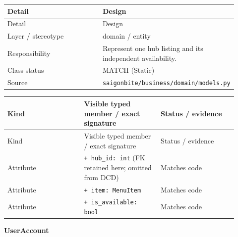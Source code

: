 \begin{longtable}{>{\raggedright\arraybackslash}p{0.4600\linewidth}>{\raggedright\arraybackslash}p{0.4600\linewidth}}
Detail & Design \\
\hline\endfirsthead
Detail & Design \\
\hline\endhead
Layer / stereotype & domain / \guillemotleft{}entity\guillemotright{} \\
Responsibility & Represent one hub listing and its independent availability. \\
Class status & MATCH (Static) \\
Source & \texttt{saigonbite/\allowbreak{}business/\allowbreak{}domain/\allowbreak{}models.\allowbreak{}py} \\
\end{longtable}
\begin{longtable}{>{\raggedright\arraybackslash}p{0.3067\linewidth}>{\raggedright\arraybackslash}p{0.3067\linewidth}>{\raggedright\arraybackslash}p{0.3067\linewidth}}
Kind & Visible typed member / exact signature & Status / evidence \\
\hline\endfirsthead
Kind & Visible typed member / exact signature & Status / evidence \\
\hline\endhead
Attribute & \texttt{+ hub\_\allowbreak{}id: int} (FK retained here; omitted from DCD) & Matches code \\
Attribute & \texttt{+ item: MenuItem} & Matches code \\
Attribute & \texttt{+ is\_\allowbreak{}available: bool} & Matches code \\
\end{longtable}
\textbf{UserAccount}

